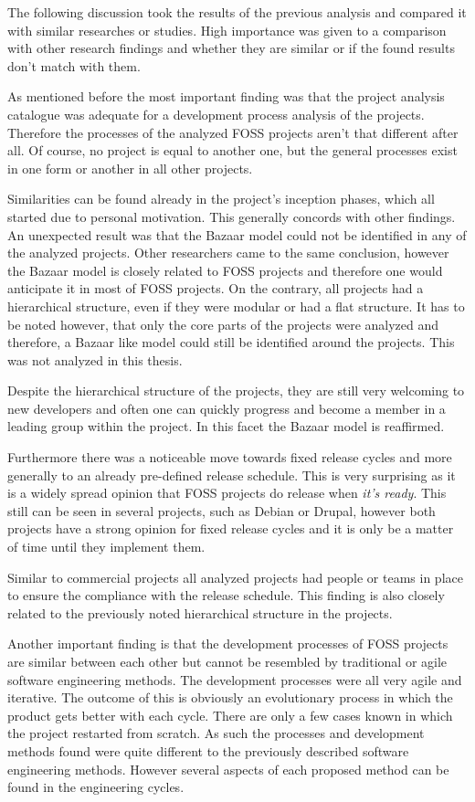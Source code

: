 The following discussion took the results of the previous analysis and compared
it with similar researches or studies. High importance was given to a
comparison with other research findings and whether they are similar or if the
found results don't match with them.

As mentioned before the most important finding was that the project analysis
catalogue was adequate for a development process analysis of the projects.
Therefore the processes of the analyzed \ac{FOSS} projects aren't that
different after all. Of course, no project is equal to another one, but the
general processes exist in one form or another in all other projects.

Similarities can be found already in the project's inception phases, which all
started due to personal motivation. This generally concords with other
findings. An unexpected result was that the Bazaar model could not be
identified in any of the analyzed projects. Other researchers came to the same
conclusion, however the Bazaar model is closely related to \ac{FOSS} projects
and therefore one would anticipate it in most of \ac{FOSS} projects. On the
contrary, all projects had a hierarchical structure, even if they were modular
or had a flat structure. It has to be noted however, that only the core parts
of the projects were analyzed and therefore, a Bazaar like model could still be
identified around the projects. This was not analyzed in this thesis.

Despite the hierarchical structure of the projects, they are still very
welcoming to new developers and often one can quickly progress and become a
member in a leading group within the project. In this facet the Bazaar model is
reaffirmed.

Furthermore there was a noticeable move towards fixed release cycles and more
generally to an already pre-defined release schedule. This is very surprising
as it is a widely spread opinion that \ac{FOSS} projects do release when
\emph{it's ready}. This still can be seen in several projects, such as Debian
or Drupal, however both projects have a strong opinion for fixed release cycles
and it is only be a matter of time until they implement them.

Similar to commercial projects all analyzed projects had people or teams in
place to ensure the compliance with the release schedule. This finding is also
closely related to the previously noted hierarchical structure in the projects.

Another important finding is that the development processes of \ac{FOSS}
projects are similar between each other but cannot be resembled by traditional
or agile software engineering methods. The development processes were all very
agile and iterative. The outcome of this is obviously an evolutionary process
in which the product gets better with each cycle. There are only a few cases
known in which the project restarted from scratch. As such the processes and
development methods found were quite different to the previously described
software engineering methods. However several aspects of each proposed method
can be found in the engineering cycles.

